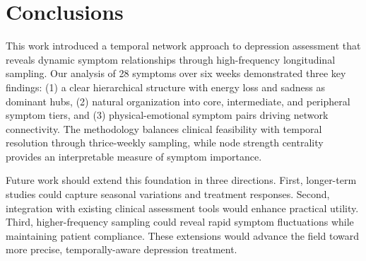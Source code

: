 \documentclass{article} %
\begin{document}
\section{Conclusions}
\label{sec:conclusion}

This work introduced a temporal network approach to depression assessment that reveals dynamic symptom relationships through high-frequency longitudinal sampling. Our analysis of 28 symptoms over six weeks demonstrated three key findings: (1) a clear hierarchical structure with energy loss and sadness as dominant hubs, (2) natural organization into core, intermediate, and peripheral symptom tiers, and (3) physical-emotional symptom pairs driving network connectivity. The methodology balances clinical feasibility with temporal resolution through thrice-weekly sampling, while node strength centrality provides an interpretable measure of symptom importance.

Future work should extend this foundation in three directions. First, longer-term studies could capture seasonal variations and treatment responses. Second, integration with existing clinical assessment tools would enhance practical utility. Third, higher-frequency sampling could reveal rapid symptom fluctuations while maintaining patient compliance. These extensions would advance the field toward more precise, temporally-aware depression treatment.



\end{document}
